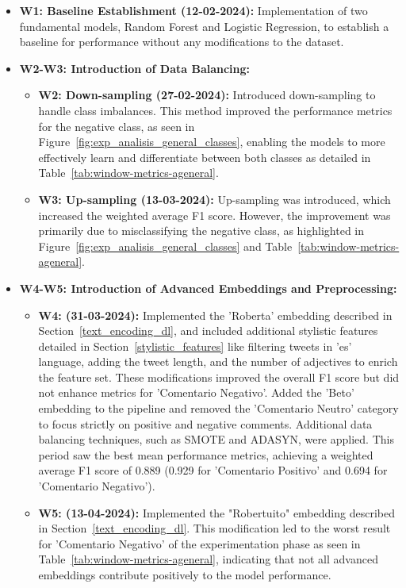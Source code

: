 \begin{itemize}
    \item \textbf{W1: Baseline Establishment (12-02-2024):} Implementation of two fundamental models, Random Forest and Logistic Regression, to establish a baseline for performance without any modifications to the dataset.

    \item \textbf{W2-W3: Introduction of Data Balancing:}
        \begin{itemize}
            \item \textbf{W2: Down-sampling (27-02-2024):} Introduced down-sampling to handle class imbalances. This method improved the performance metrics for the negative class, as seen in Figure~\ref{fig:exp_analisis_general_classes}, enabling the models to more effectively learn and differentiate between both classes as detailed in Table~\ref{tab:window-metrics-ageneral}.
            
            \item \textbf{W3: Up-sampling (13-03-2024):} Up-sampling was introduced, which increased the weighted average F1 score. However, the improvement was primarily due to misclassifying the negative class, as highlighted in Figure~\ref{fig:exp_analisis_general_classes} and Table~\ref{tab:window-metrics-ageneral}.
        \end{itemize}

    \item \textbf{W4-W5: Introduction of Advanced Embeddings and Preprocessing:}
        \begin{itemize}
            \item \textbf{W4: (31-03-2024):} Implemented the 'Roberta' embedding described in Section~\ref{text_encoding_dl}, and included additional stylistic features detailed in Section~\ref{stylistic_features} like filtering tweets in 'es' language, adding the tweet length, and the number of adjectives to enrich the feature set. These modifications improved the overall F1 score but did not enhance metrics for 'Comentario Negativo'. Added the 'Beto' embedding to the pipeline and removed the 'Comentario Neutro' category to focus strictly on positive and negative comments. Additional data balancing techniques, such as SMOTE and ADASYN, were applied. This period saw the best mean performance metrics, achieving a weighted average F1 score of 0.889 (0.929 for 'Comentario Positivo' and 0.694 for 'Comentario Negativo').
        
            \item \textbf{W5: (13-04-2024):} Implemented the "Robertuito" embedding described in Section~\ref{text_encoding_dl}. This modification led to the worst result for 'Comentario Negativo' of the experimentation phase as seen in Table~\ref{tab:window-metrics-ageneral}, indicating that not all advanced embeddings contribute positively to the model performance.
        \end{itemize}


\end{itemize}
